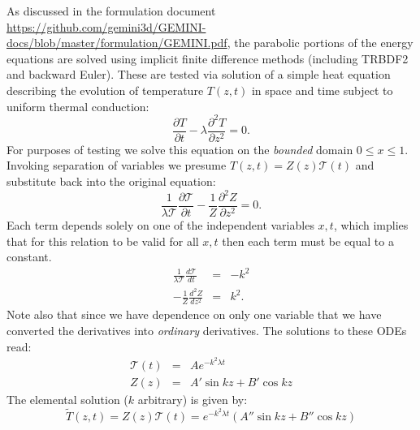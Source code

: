 \documentclass[11pt,letterpaper]{article}
\begin{document}
As discussed in the formulation document \url{https://github.com/gemini3d/GEMINI-docs/blob/master/formulation/GEMINI.pdf}, the parabolic portions of the energy equations are solved using implicit finite difference methods (including TRBDF2 and backward Euler).  These are tested via solution of a simple heat equation describing the evolution of temperature $T(z,t)$ in space and time subject to uniform thermal conduction:
\begin{equation}
\frac{\partial T}{\partial t} - \lambda \frac{\partial^2 T}{\partial z^2} = 0.
\end{equation}
For purposes of testing we solve this equation on the \emph{bounded} domain $0 \le x \le 1$.  Invoking separation of variables we presume $T(z,t)=Z(z) \mathcal{T}(t)$ and substitute back into the original equation:  
\begin{equation}
\frac{1}{\lambda \mathcal{T}} \frac{\partial \mathcal{T}}{\partial t} - \frac{1}{Z} \frac{\partial^2 Z}{\partial z^2} = 0.
\end{equation}
Each term depends solely on one of the independent variables $x,t$, which implies that for this relation to be valid for all $x,t$ then each term must be equal to a constant.  
\begin{eqnarray}
\frac{1}{\lambda \mathcal{T}} \frac{d \mathcal{T}}{d t} &=& -k^2 \\
- \frac{1}{Z} \frac{d^2 Z}{d z^2} &=& k^2.
\end{eqnarray}
Note also that since we have dependence on only one variable that we have converted the derivatives into \emph{ordinary} derivatives.  The solutions to these ODEs read:
\begin{eqnarray}
\mathcal{T}(t) &=& A e^{-k^2 \lambda t} \\
Z(z) &=& A' \sin kz + B' \cos kz
\end{eqnarray}
The elemental solution ($k$ arbitrary) is given by: 
\begin{equation}
\tilde{T}(z,t)=Z(z) \mathcal{T}(t) = e^{-k^2 \lambda t} \left( A'' \sin kz + B'' \cos kz \right)
\end{equation}
\end{document}
